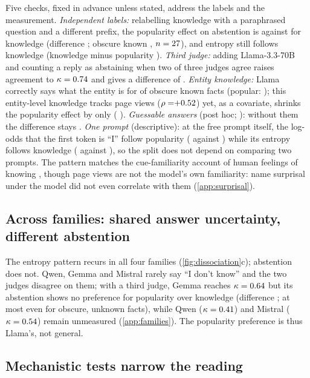 \documentclass{article}
\newcommand{\idk}{``I don't know''}
\begin{document}
Five checks, fixed in advance unless stated, address the labels and the measurement. \emph{Independent labels:} relabelling knowledge with a paraphrased question and a different prefix, the popularity effect on abstention is \eoPop{} against \eoKnow{} for knowledge (difference \eoDiff{} \eoDiffCI; obscure known \eoObsKnown, $n=27$), and entropy still follows knowledge (knowledge minus popularity \eoEntKmP{} \eoEntKmPCI). \emph{Third judge:} adding Llama-3.3-70B and counting a reply as abstaining when two of three judges agree raises agreement to $\kappa=0.74$ and gives a difference of \tjLlamaDiff{} \tjLlamaDiffCI. \emph{Entity knowledge:} Llama correctly says what the entity is for \ekObsKnown{} of obscure known facts (popular: \ekPopKnown); this entity-level knowledge tracks page views ($\rho=\ekRho$) yet, as a covariate, shrinks the popularity effect by only \ekShrink{} (\ekObs{} \ekObsCI). \emph{Guessable answers} (post hoc; \citealp{mallen2023popqa}): without them the difference stays \gsDiff{} \gsDiffCI. \emph{One prompt} (descriptive): at the free prompt itself, the log-odds that the first token is ``I'' follow popularity (\eoFreeIPop{} against \eoFreeIKnow) while its entropy follows knowledge (\eoFreeEntKnow{} against \eoFreeEntPop), so the split does not depend on comparing two prompts. The pattern matches the cue-familiarity account of human feelings of knowing \citep{reder1992,schwartz1992}, though page views are not the model's own familiarity: name surprisal under the model did not even correlate with them (\cref{app:surprisal}).

\subsection{Across families: shared answer uncertainty, different abstention}
\label{sec:families}

The entropy pattern recurs in all four families (\cref{fig:dissociation}c); abstention does not. Qwen, Gemma and Mistral rarely say \idk{} and the two judges disagree on them; with a third judge, Gemma reaches $\kappa=0.64$ but its abstention shows no preference for popularity over knowledge (difference \tjGemmaDiff{} \tjGemmaDiffCI; at most \tjGemmaObsUnk{} even for obscure, unknown facts), while Qwen ($\kappa=0.41$) and Mistral ($\kappa=0.54$) remain unmeasured (\cref{app:families}). The popularity preference is thus Llama's, not general.

\subsection{Mechanistic tests narrow the reading}
\label{sec:mech}
\end{document}

